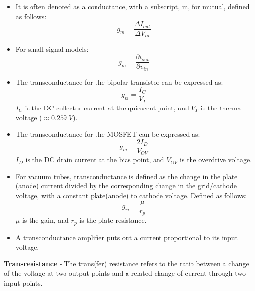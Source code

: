     \begin{itemize}
        \setlength\itemsep{0.5em}
        \item{It is often denoted as a conductance, with a subscript, m, for mutual, defined as follows:}
            \begin{equation}
                g_m = \frac{\Delta I_{out}}{\Delta V_{in}}
            \end{equation}
        \item{For small signal models:}
            \begin{equation}
                g_m = \frac{\partial i_{out}}{\partial v_{in}}
            \end{equation}
        \item{The transconductance for the bipolar transistor can be expressed as:}
            \begin{equation}
                g_m = \frac{I_C}{V_T}
            \end{equation}
            $I_C$ is the DC collector current at the quiescent point, and $V_T$ is the thermal voltage ($\approx 0.259\;V$).
        \item{The transconductance for the MOSFET can be expressed as:}
            \begin{equation}
                g_m = \frac{2I_D}{V_{OV}}
            \end{equation}
            $I_D$ is the DC drain current at the bias point, and $V_{OV}$ is the overdrive voltage.
        \item{For vacuum tubes, transconductance is defined as the change in the plate (anode) current divided by the corresponding change in the grid/cathode voltage, with a constant plate(anode) to cathode voltage.  Defined as follows:}
            \begin{equation}
                g_m = \frac{\mu}{r_p}
            \end{equation}
            $\mu$ is the gain, and $r_p$ is the plate resistance.
        \item{A transconductance amplifier puts out a current proportional to its input voltage.}
    \end{itemize}
\vspace{0.5cm}
    \textbf{Transresistance} - The trans(fer) resistance refers to the ratio between a change of the voltage at two output points and a related change of current through two input points.
